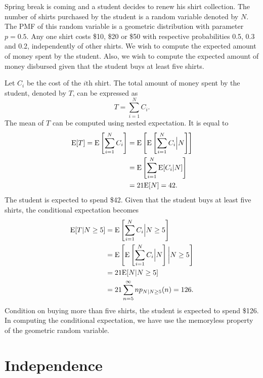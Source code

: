 \begin{example}
Spring break is coming and a student decides to renew his shirt collection.
The number of shirts purchased by the student is a random variable denoted by $N$.
The PMF of this random variable is a geometric distribution with parameter $p = 0.5$.
Any one shirt costs \$10, \$20 or \$50 with respective probabilities 0.5, 0.3 and 0.2, independently of other shirts.
We wish to compute the expected amount of money spent by the student.
Also, we wish to compute the expected amount of money disbursed given that the student buys at least five shirts.

Let $C_i$ be the cost of the $i$th shirt.
The total amount of money spent by the student, denoted by $T$, can be expressed as
\begin{equation*}
T = \sum_{i=1}^N C_i .
\end{equation*}
The mean of $T$ can be computed using nested expectation.
It is equal to
\begin{equation*}
\begin{split}
\mathrm{E} [T] = \mathrm{E} \left[ \sum_{i=1}^N C_i \right]
&= \mathrm{E} \left[ \mathrm{E} \left[
\sum_{i=1}^N C_i \Big| N \right] \right] \\
&= \mathrm{E} \left[ \sum_{i=1}^N \mathrm{E} [ C_i | N ] \right] \\
&= 21 \mathrm{E} [ N ] = 42.
\end{split}
\end{equation*}
The student is expected to spend \$42.
Given that the student buys at least five shirts, the conditional expectation becomes
\begin{equation*}
\begin{split}
\mathrm{E} [T | N \geq 5]
&= \mathrm{E} \left[ \sum_{i=1}^N C_i \Big| N \geq 5 \right] \\
&= \mathrm{E} \left[ \mathrm{E} \left[
\sum_{i=1}^N C_i \Big| N \right] \bigg| N \geq 5 \right] \\
&= 21 \mathrm{E} [ N | N \geq 5] \\
&= 21 \sum_{n=5}^{\infty} n p_{N | N \geq 5} (n)
= 126 .
\end{split}
\end{equation*}
Condition on buying more than five shirts, the student is expected to spend \$126.
In computing the conditional expectation, we have use the memoryless property of the geometric random variable.
\end{example}


\section{Independence}


